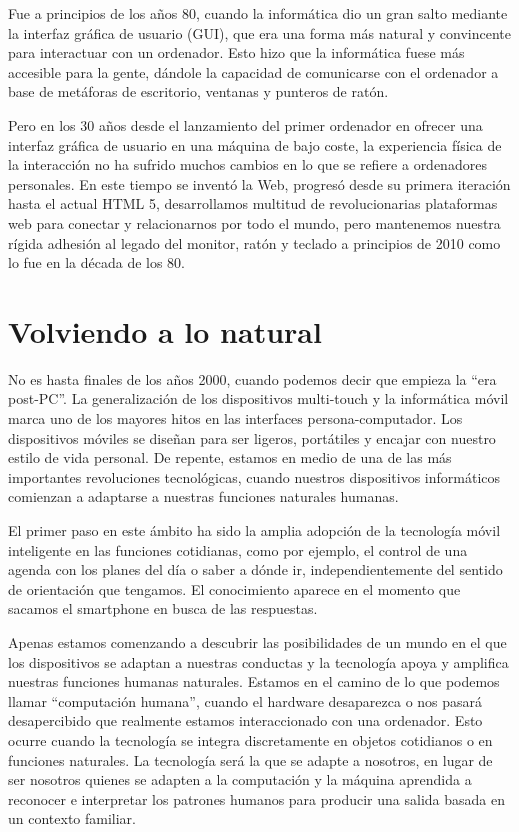 Fue a principios de los años 80, cuando la informática dio un gran salto mediante la interfaz gráfica de usuario (GUI), que era una forma más natural y convincente para interactuar con un ordenador. Esto hizo que la informática fuese más accesible para la gente, dándole la capacidad de comunicarse con el ordenador a base de metáforas de escritorio, ventanas y punteros de ratón.

Pero en los 30 años desde el lanzamiento del primer ordenador en ofrecer una interfaz gráfica de usuario en una máquina de bajo coste, la experiencia física de la interacción no ha sufrido muchos cambios en lo que se refiere a ordenadores personales. En este tiempo se inventó la Web, progresó desde su primera iteración hasta el actual HTML 5, desarrollamos multitud de revolucionarias plataformas web para conectar y relacionarnos por todo el mundo, pero mantenemos nuestra rígida adhesión al legado del monitor, ratón y teclado a principios de 2010 como lo fue en la década de los 80. 

\section{Volviendo a lo natural}
No es hasta finales de los años 2000, cuando podemos decir que empieza la ``era post-PC''. La generalización de los dispositivos multi-touch y la informática móvil marca uno de los mayores hitos en las interfaces persona-computador. Los dispositivos móviles se diseñan para ser ligeros, portátiles y encajar con nuestro estilo de vida personal. De repente, estamos en medio de una de las más importantes revoluciones tecnológicas, cuando nuestros dispositivos informáticos comienzan a adaptarse a nuestras funciones naturales humanas.

El primer paso en este ámbito ha sido la amplia adopción de la tecnología móvil inteligente en las funciones cotidianas, como por ejemplo, el control de una agenda con los planes del día o saber a dónde ir, independientemente del sentido de orientación que tengamos. El conocimiento aparece en el momento que sacamos el smartphone en busca de las respuestas.

Apenas estamos comenzando a descubrir las posibilidades de un mundo en el que los dispositivos se adaptan a nuestras conductas y la tecnología apoya y amplifica nuestras funciones humanas naturales. Estamos en el camino de lo que podemos llamar ``computación humana'', cuando el hardware desaparezca o nos pasará desapercibido que realmente estamos interaccionado con una ordenador. Esto ocurre cuando la tecnología se integra discretamente en objetos cotidianos o en funciones naturales. La tecnología será la que se adapte a nosotros, en lugar de ser nosotros quienes se adapten a la computación y la máquina aprendida a reconocer e interpretar los patrones humanos para producir una salida basada en un contexto familiar.

